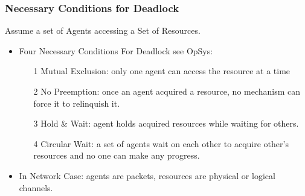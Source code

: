 \documentclass{beamer}
\renewcommand{\emph}[1]{\textcolor{structure}{#1}}
\newcommand{\emp}[1]{\textcolor{DikuRed}{ #1}}
\begin{document}
\begin{frame}[fragile,t]
\frametitle{Necessary Conditions for Deadlock}

Assume a set of Agents accessing a Set of Resources.

\begin{itemize}
    \item \emp{Four Necessary Conditions For Deadlock see OpSys:}
    \begin{itemize}
        \item[1] \emp{Mutual Exclusion}: only one agent can access the resource at a time
        \item[2] \emp{No Preemption}: once an agent acquired a resource, no mechanism can force
                it to relinquish it.
        \item[3] \emp{Hold \& Wait}: agent holds acquired resources while waiting for others.
        \item[4] \emp{Circular Wait}: a set of agents wait on each other to acquire other's 
                resources and no one can make any progress. 
    \end  {itemize}\bigskip

    \item \emph{In Network Case: agents are packets, resources are physical or logical channels.}
\end  {itemize}


\end{frame}
\end{document}
